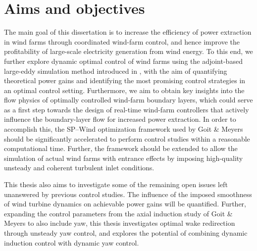 \section{Aims and objectives}\label{sec:intro_aims}
The main goal of this dissertation is to increase the efficiency of power extraction in wind farms through coordinated wind-farm control, and hence improve the profitability of large-scale electricity generation from wind energy. To this end, we further explore dynamic optimal control of wind farms using the adjoint-based large-eddy simulation method introduced in \cite{goit2015optimal}, with the aim of quantifying theoretical power gains and identifying the most promising control strategies in an optimal control setting. Furthermore, we aim to obtain key insights into the flow physics of optimally controlled wind-farm boundary layers, which could serve as a first step towards the design of real-time wind-farm controllers that actively influence the boundary-layer flow for increased power extraction. In order to accomplish this, the SP--Wind optimization framework used by Goit \& Meyers should be significantly accelerated to perform control studies within a reasonable computational time. Further, the framework should be extended to allow the simulation of actual wind farms with entrance effects by imposing high-quality unsteady and coherent turbulent inlet conditions. 

This thesis also aims to investigate some of the remaining open issues left unanswered by previous control studies. The influence of the imposed smoothness of wind turbine dynamics on achievable power gains will be quantified. Further, expanding the control parameters from the axial induction study of Goit \& Meyers to also include yaw, this thesis investigates optimal wake redirection through unsteady yaw control, and explores the potential of combining dynamic induction control with dynamic yaw control. 

